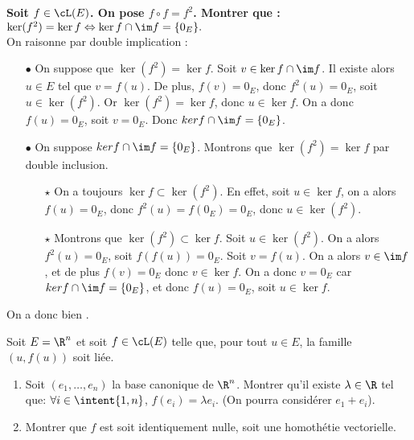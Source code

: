 \documentclass[a4paper, 11pt,reqno]{article}
\begin{document}
\begin{correction}  \;
	\textbf{Soit $f\in\cL(E)$. On pose $f\circ f=f^2$. Montrer que :} $\ker (f^2)=\ker f \Leftrightarrow \ker f \cap \im f =\lbrace 0_E\rbrace.$\\
	On raisonne par double implication :
	\begin{itemize}
		\item[$\bullet$] On suppose que $\ker (f^2)=\ker f $. Soit $v \in  \ker f \cap \im f$. Il existe alors  $u \in E$ tel que $v=f(u)$. De plus, $f(v) = 0_E$, donc $f^2(u) = 0_E$, soit $u \in \ker (f^2)$. Or $\ker (f^2)=\ker f $, donc $u \in \ker f$. On a donc $f(u) = 0_E$, soit $v=0_E$. Donc $ker f \cap \im f =\lbrace 0_E\rbrace$.
		\item[$\bullet$] On suppose $ker f \cap \im f =\lbrace 0_E\rbrace$. Montrons que $\ker (f^2)=\ker f $ par double inclusion.
		      \begin{itemize}
			      \item[$\star$] On a toujours $\ker f \subset \ker (f^2) $. En effet, soit $u \in \ker f$, on a alors $f(u)=0_E$, donc $f^2(u)=f(0_E)=0_E$, donc $u \in \ker (f^2)$.
			      \item[$\star$] Montrons que $\ker (f^2)\subset \ker f $. Soit $u \in \ker(f^2)$. On a alors $f^2(u) = 0_E$, soit $f(f(u))=0_E$. Soit $v=f(u)$. On a alors $v \in \im f$, et de plus $f(v) = 0_E$ donc $v \in \ker f$. On a donc $v=0_E$ car $ker f \cap \im f =\lbrace 0_E\rbrace$, et donc $f(u)=0_E$, soit $u \in \ker f$.
		      \end{itemize}
	\end{itemize}
	On a donc bien .
\end{correction}
\begin{exercice}  \;
	Soit $E=\R^n$ et soit $f\in\cL(E)$ telle que, pour tout $u\in E$, la famille $(u,f(u))$ soit li\'ee.
	\begin{enumerate}
		\item Soit $(e_1,\dots, e_n)$ la base canonique de $\R^n$. Montrer qu'il existe $\lambda\in\R$ tel que: $\forall i\in\intent{ 1,n}$, $f(e_i)=\lambda e_i$.
		      (On pourra consid\'erer $e_1+e_i$).
		\item Montrer que $f$ est soit identiquement nulle, soit une homoth\'etie vectorielle.
	\end{enumerate}
\end{exercice}
\end{document}
